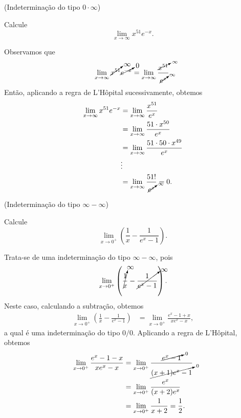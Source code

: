 \begin{exeresol}(Indeterminação do tipo $0\cdot\infty$)

  Calcule
  \begin{equation}
    \lim_{x\to \infty} x^{51}e^{-x}.
  \end{equation}
\end{exeresol}
\begin{resol}
  Observamos que
  \begin{equation}
    \lim_{x\to \infty} \cancelto{\infty}{x^{51}}\cancelto{0}{e^{-x}} = \lim_{x\to \infty} \frac{\cancelto{\infty}{x^{51}}}{\cancelto{\infty}{e^{x}}}.
  \end{equation}
  Então, aplicando a regra de L'Hôpital sucessivamente, obtemos
  \begin{align}
    \lim_{x\to\infty} x^{51}e^{-x} &= \lim_{x\to\infty} \frac{x^{51}}{e^x} \\
                                   &= \lim_{x\to\infty} \frac{51\cdot x^{50}}{e^x} \\
                                   &= \lim_{x\to\infty} \frac{51\cdot 50\cdot x^{49}}{e^x} \\
                                   &\vdots \\
                                   &= \lim_{x\to\infty} \frac{51!}{\cancelto{\infty}{e^x}} = 0.
  \end{align}
\end{resol}

\begin{exeresol}(Indeterminação do tipo $\infty - \infty$)

  Calcule
  \begin{equation}
    \lim_{x\to 0^+} \left(\frac{1}{x} - \frac{1}{e^x-1}\right).
  \end{equation}
\end{exeresol}
\begin{resol}
  Trata-se de uma indeterminação do tipo $\infty - \infty$, pois
  \begin{equation}
    \lim_{x\to 0^+} \left(\cancelto{\infty}{\frac{1}{x}} - \cancelto{\infty}{\frac{1}{e^x-1}}\right).
  \end{equation}
  Neste caso, calculando a subtração, obtemos
  \begin{align}
    \lim_{x\to 0^+} \left(\frac{1}{x} - \frac{1}{e^x-1}\right) &= \lim_{x\to 0^+} \frac{e^x-1+x}{xe^x-x},
  \end{align}
  a qual é uma indeterminação do tipo $0/0$. Aplicando a regra de L'Hôpital, obtemos
  \begin{align}
    \lim_{x\to 0^+} \frac{e^x-1-x}{xe^x-x} &= \lim_{x\to 0^+} \frac{\cancelto{0}{e^x-1}}{\cancelto{0}{(x+1)e^x-1}} \\
                                           &= \lim_{x\to 0^+} \frac{e^x}{(x+2)e^x} \\
    &= \lim_{x\to 0^+} \frac{1}{x+2} = \frac{1}{2}.
  \end{align}
\end{resol}

